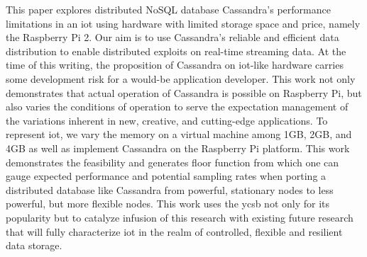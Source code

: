 This paper explores distributed NoSQL database Cassandra’s performance limitations in an \gls{iot} using hardware with limited storage space and price, namely the Raspberry Pi 2.
Our aim is to use Cassandra’s reliable and efficient data distribution to enable distributed exploits on real-time streaming data.
At the time of this writing, the proposition of Cassandra on \gls{iot}-like hardware carries some development risk for a would-be application developer.
This work not only demonstrates that actual operation of Cassandra is possible on Raspberry Pi, but also varies the conditions of operation to serve the expectation management of the variations inherent in new, creative, and cutting-edge applications. 
To represent \gls{iot}, we vary the memory on a virtual machine among 1GB, 2GB, and 4GB as well as implement Cassandra on the Raspberry Pi platform.
This work demonstrates the feasibility and generates floor function from which one can gauge expected performance and potential sampling rates when porting a distributed database like Cassandra from powerful, stationary nodes to less powerful, but more flexible nodes.
This work uses the \gls{ycsb} not only for its popularity but to catalyze infusion of this research with existing future research that will fully characterize \gls{iot} in the realm of controlled, flexible and resilient data storage.

